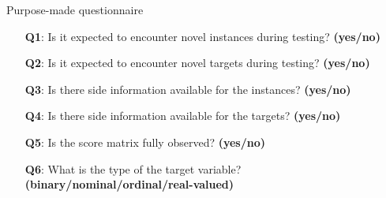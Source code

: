 \documentclass[]{beamer}
\begin{document}
\begin{frame}{Purpose-made questionnaire}
\begin{itemize}
\itemindent=8pt    \item [\textbf{Q1}:] Is it expected to encounter novel instances during testing? \textbf{(yes/no)}
\itemindent=8pt    \item [\textbf{Q2}:] Is it expected to encounter novel targets during testing? \textbf{(yes/no)}
\itemindent=8pt    \item [\textbf{Q3}:] Is there side information available for the instances? \textbf{(yes/no)}
\itemindent=8pt    \item [\textbf{Q4}:] Is there side information available for the targets? \textbf{(yes/no)}
\itemindent=8pt    \item [\textbf{Q5}:] Is the score matrix fully observed? \textbf{(yes/no)}
\itemindent=8pt    \item [\textbf{Q6}:] What is the type of the target variable? \textbf{(binary/nominal/ordinal/real-valued)}
\end{itemize}
\end{frame}
\end{document}
